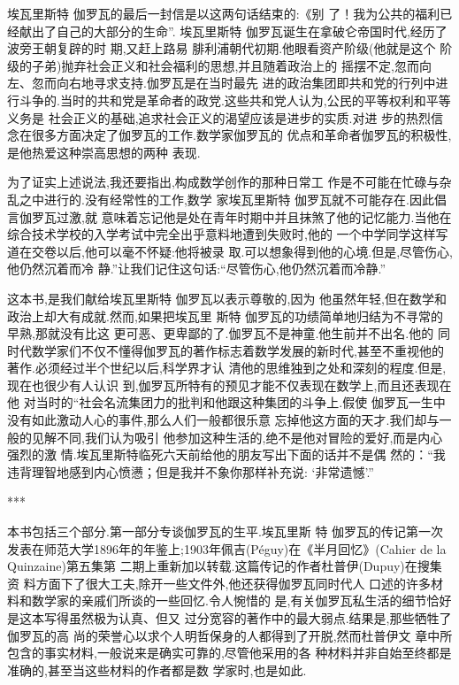 埃瓦里斯特 \textbullet 伽罗瓦的最后一封信是以这两句话结束的:《别 了！我为公共的福利已经献出了自己的大部分的生命”. 埃瓦里斯特 \textbullet 伽罗瓦诞生在拿破仑帝国时代,经历了波旁王朝复辟的时 期,又赶上路易 \textbullet 腓利浦朝代初期.他眼看资产阶级(他就是这个 阶级的子弟)抛弃社会正义和社会福利的思想,并且随着政治上的 摇摆不定,忽而向左、忽而向右地寻求支持.伽罗瓦是在当时最先 进的政治集团即共和党的行列中进行斗争的.当时的共和党是革命者的政党.这些共和党人认为,公民的平等权利和平等义务是 社会正义的基础,追求社会正义的渴望应该是进步的实质.对进 步的热烈信念在很多方面决定了伽罗瓦的工作.数学家伽罗瓦的 优点和革命者伽罗瓦的积极性,是他热爱这种崇高思想的两种 表现.

为了证实上述说法,我还要指出,构成数学创作的那种日常工 作是不可能在忙碌与杂乱之中进行的.没有经常性的工作,数学 家埃瓦里斯特 \textbullet 伽罗瓦就不可能存在.因此倡言伽罗瓦过激,就 意味着忘记他是处在青年时期中并且抹煞了他的记忆能力.当他在综合技术学校的入学考试中完全出乎意料地遭到失败时,他的 一个中学同学这样写道在交卷以后,他可以毫不怀疑:他将被录 取.可以想象得到他的心境.但是,尽管伤心,他仍然沉着而冷 静.”让我们记住这句话:“尽管伤心,他仍然沉着而冷静.”

这本书,是我们献给埃瓦里斯特 \textbullet 伽罗瓦以表示尊敬的,因为 他虽然年轻,但在数学和政治上却大有成就.然而,如果把埃瓦里 斯特 \textbullet 伽罗瓦的功绩简单地归结为不寻常的早熟,那就没有比这 更可恶、更卑鄙的了.伽罗瓦不是神童.他生前并不出名.他的 同时代数学家们不仅不懂得伽罗瓦的著作标志着数学发展的新时代,甚至不重视他的著作.必须经过半个世纪以后,科学界才认 清他的思维独到之处和深刻的程度.但是,现在也很少有人认识 到,伽罗瓦所特有的预见才能不仅表现在数学上,而且还表现在他 对当时的“社会名流集团力的批判和他跟这种集团的斗争上.假使 伽罗瓦一生中没有如此激动人心的事件,那么人们一般都很乐意 忘掉他这方面的天才.我们却与一般的见解不同,我们认为吸引 他参加这种生活的,绝不是他对冒险的爱好,而是内心强烈的激 情.埃瓦里斯特临死六天前给他的朋友写出下面的话并不是偶 然的：“我违背理智地感到内心愤懑；但是我并不象你那样补充说: ‘非常遗憾'.”

\begin{center}
	***
\end{center}

本书包括三个部分.第一部分专谈伽罗瓦的生平.埃瓦里斯 特 \textbullet 伽罗瓦的传记第一次发表在师范大学1896年的年鉴上;1903年佩吉(Péguy)在《半月回忆》(Cahier de la Quinzaine)第五集第 二期上重新加以转载.这篇传记的作者杜普伊(Dupuy)在搜集资 料方面下了很大工夫,除开一些文件外,他还获得伽罗瓦同时代人 口述的许多材料和数学家的亲戚们所谈的一些回忆.令人惋惜的
是,有关伽罗瓦私生活的细节恰好是这本写得虽然极为认真、但又 过分宽容的著作中的最大弱点.结果是,那些牺牲了伽罗瓦的高 尚的荣誉心以求个人明哲保身的人都得到了开脱,然而杜普伊文 章中所包含的事实材料,一般说来是确实可靠的,尽管他采用的各 种材料并非自始至终都是准确的,甚至当这些材料的作者都是数 学家时,也是如此.

